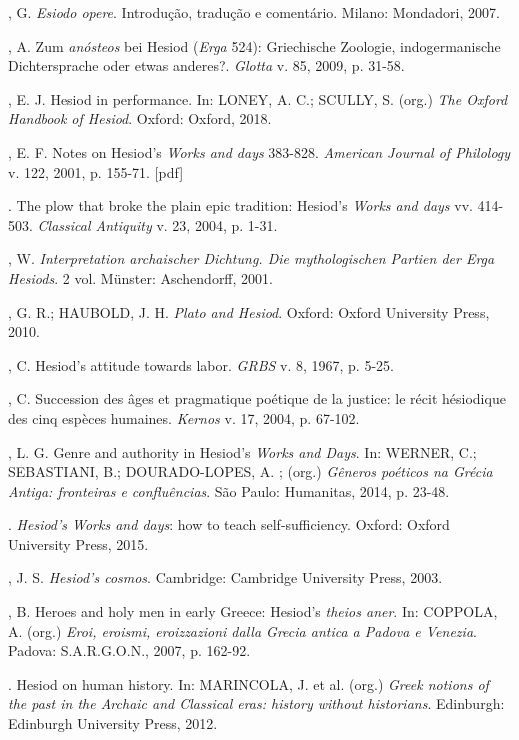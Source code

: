 \begin{bibliohedra}
, G. \emph{Esiodo opere}. Introdução, tradução e comentário.
Milano: Mondadori, 2007.

, A. Zum \emph{anósteos} bei Hesiod (\emph{Erga} 524):
Griechische Zoologie, indogermanische Dichtersprache oder etwas
anderes?. \emph{Glotta} v. 85, 2009, p. 31-58.

, E. J. Hesiod in performance. In: LONEY, A. C.; SCULLY, S. (org.)
\emph{The Oxford Handbook of Hesiod}. Oxford: Oxford, 2018.

, E. F. Notes on Hesiod's \emph{Works and days} 383-828.
\emph{American Journal of Philology} v. 122, 2001, p. 155-71. {[}pdf{]}

\titidem. The plow that broke the plain epic tradition: Hesiod's \emph{Works
and days} vv. 414-503. \emph{Classical Antiquity} v. 23, 2004, p. 1-31.

, W. \emph{Interpretation archaischer Dichtung. Die mythologischen
Partien der Erga} \emph{Hesiods}. 2 vol. Münster: Aschendorff, 2001.

, G. R.; HAUBOLD, J. H. \emph{Plato and Hesiod}. Oxford:
Oxford University Press, 2010.

, C. Hesiod's attitude towards labor. \emph{GRBS} v. 8,
1967, p. 5-25.

, C. Succession des âges et pragmatique poétique de la justice: le
récit hésiodique des cinq espèces humaines. \emph{Kernos} v. 17, 2004,
p. 67-102.

, L. G. Genre and authority in Hesiod's \emph{Works and Days}.
In: WERNER, C.; SEBASTIANI, B.; DOURADO-LOPES, A. ; (org.) \emph{Gêneros
poéticos na Grécia Antiga: fronteiras e confluências}. São Paulo:
Humanitas, 2014, p. 23-48.

\titidem. \emph{Hesiod's Works and days}: how to teach self-sufficiency.
Oxford: Oxford University Press, 2015.

, J. S. \emph{Hesiod's cosmos}. Cambridge: Cambridge University
Press, 2003.

, B. Heroes and holy men in early Greece: Hesiod's \emph{theios
aner}. In: COPPOLA, A. (org.) \emph{Eroi, eroismi, eroizzazioni dalla
Grecia antica a Padova e Venezia}. Padova: S.A.R.G.O.N., 2007, p.
162-92.

\titidem. Hesiod on human history. In: MARINCOLA, J. et al. (org.) \emph{Greek
notions of the past in the Archaic and Classical eras: history without
historians}. Edinburgh: Edinburgh University Press, 2012.


\end{bibliohedra}
